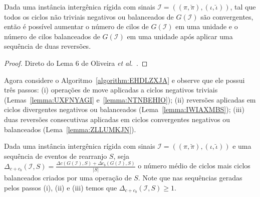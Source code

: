 \begin{lemma}\label{lemma:ZLLUMKJN}
Dada uma instância intergênica rígida com sinais $\mathcal{I}=((\pi,\breve\pi),(\iota,\breve\iota))$, tal que todos os ciclos não triviais negativos ou balanceados de $G(\mathcal{I})$ são convergentes, então é possível aumentar o número de cilos de $G(\mathcal{I})$ em uma unidade e o número de cilos balanceados de $G(\mathcal{I})$ em uma unidade após aplicar uma sequência de duas reversões.
\end{lemma}
\begin{proof}
Direto do Lema 6 de Oliveira \textit{et al.}~\cite{2021b-oliveira-etal}.
\end{proof}

Agora considere o Algoritmo~\ref{algorithm:EHDLZXJA} e observe que ele possui três passos: (i) operações de move aplicadas a ciclos negativos triviais (Lemas~\ref{lemma:UXFNYAGI} e~\ref{lemma:NTNBEHIO}); (ii) reversões aplicadas em ciclos divergentes negativos ou balanceados (Lema~\ref{lemma:IWIAXMBS}); (iii) duas reversões consecutivas aplicadas em ciclos convergentes negativos ou balanceados (Lema~\ref{lemma:ZLLUMKJN}).



Dada uma instância intergênica rígida com sinais $\mathcal{I}=((\pi,\breve\pi),(\iota,\breve\iota))$ e uma sequência de eventos de rearranjo $S$, seja $\Delta_{c+c_b} (\mathcal{I},S) = \frac{\Delta c(G(\mathcal{I}),S) + \Delta c_b(G(\mathcal{I}),S)}{|S|}$ o número médio de ciclos mais ciclos balanceados criados por uma operação de $S$. Note que nas sequências geradas pelos passos (i), (ii) e (iii) temos que $\Delta_{c+c_b}(\mathcal{I},S) \ge 1$.

